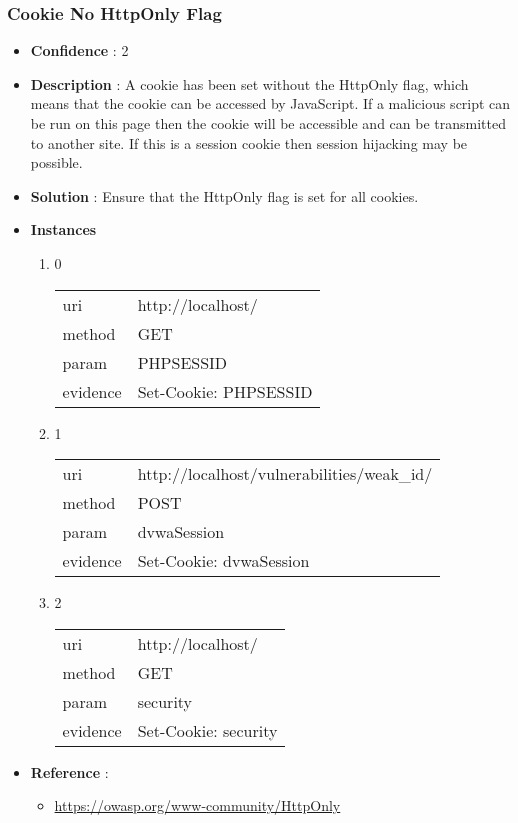 \documentclass[10pt]{article}
\begin{document}
\subsubsection{Cookie No HttpOnly Flag}
\begin{itemize}
\item[] \textbf{Confidence} : 2
\item[] \textbf{Description} : A cookie has been set without the HttpOnly flag, which means that the cookie can be accessed by JavaScript. If a malicious script can be run on this page then the cookie will be accessible and can be transmitted to another site. If this is a session cookie then session hijacking may be possible.
\item[] \textbf{Solution} :  Ensure that the HttpOnly flag is set for all cookies.
\item[] \textbf{Instances}
\begin{enumerate}
\item[] 0
\begin{tabular}{| l | p{14cm}}
uri & http://localhost/ \\
method & GET \\
param & PHPSESSID \\
evidence & Set-Cookie: PHPSESSID \\
\end{tabular}
\item[] 1
\begin{tabular}{| l | p{14cm}}
uri & http://localhost/vulnerabilities/weak{\_}id/ \\
method & POST \\
param & dvwaSession \\
evidence & Set-Cookie: dvwaSession \\
\end{tabular}
\item[] 2
\begin{tabular}{| l | p{14cm}}
uri & http://localhost/ \\
method & GET \\
param & security \\
evidence & Set-Cookie: security \\
\end{tabular}
\end{enumerate}
\item[] \textbf{Reference} : 
\begin{itemize}
\item \url{https://owasp.org/www-community/HttpOnly}
\end{itemize}
\end{itemize}
\end{document}
